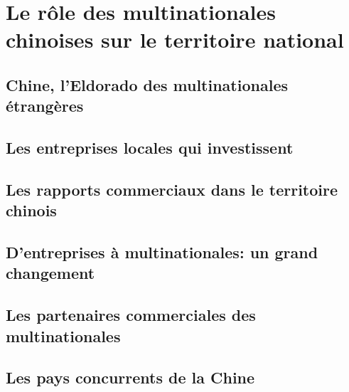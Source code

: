 \section{Le rôle des multinationales chinoises sur le territoire national}
\subsection{Chine, l'Eldorado des multinationales étrangères}
\subsection{Les entreprises locales qui investissent}
\subsection{Les rapports commerciaux dans le territoire chinois}
\subsection{D'entreprises à multinationales: un grand changement}
\subsection{Les partenaires commerciales des multinationales}
\subsection{Les pays concurrents de la Chine}